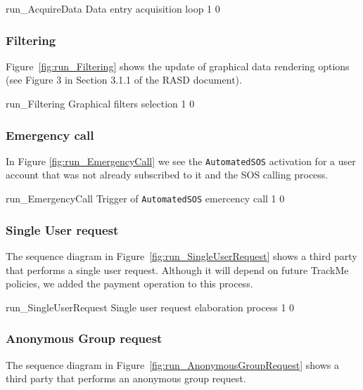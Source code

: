 \documentclass[../DD0.tex]{subfiles}
\begin{document}
      \fetchUML
        {run_AcquireData}
        {Data entry acquisition loop}
        {1}           %
        {0}           %

    \clearpage
    \subsubsection{Filtering}
    \label{sec:filtering}

      Figure~\ref{fig:run_Filtering} shows the update of graphical data rendering options (see Figure 3 in Section 3.1.1 of the RASD document).

      \fetchUML
        {run_Filtering}
        {Graphical filters selection}
        {1}           %
        {0}           %

    \clearpage
    \subsubsection{Emergency call}
    \label{sec:automatedSOS}

      In Figure \ref{fig:run_EmergencyCall} we see the \texttt{AutomatedSOS} activation for a user account that was not already subscribed to it and the SOS calling process.

      \fetchUML
        {run_EmergencyCall}
        {Trigger of \texttt{AutomatedSOS} emercency call}
        {1}           %
        {0}           %

    \clearpage
    \subsubsection{Single User request}
    \label{sec:singleuser}

      The sequence diagram in Figure~\ref{fig:run_SingleUserRequest} shows a third party that performs a single user request. Although it will depend on future TrackMe policies, we added the payment operation to this process.

      \fetchUML
        {run_SingleUserRequest}
        {Single user request elaboration process}
        {1}           %
        {0}           %

    \clearpage
    \subsubsection{Anonymous Group request}
    \label{sec:anonymousgroup}

      The sequence diagram in Figure~\ref{fig:run_AnonymousGroupRequest} shows a third party that performs an anonymous group request.
\end{document}
